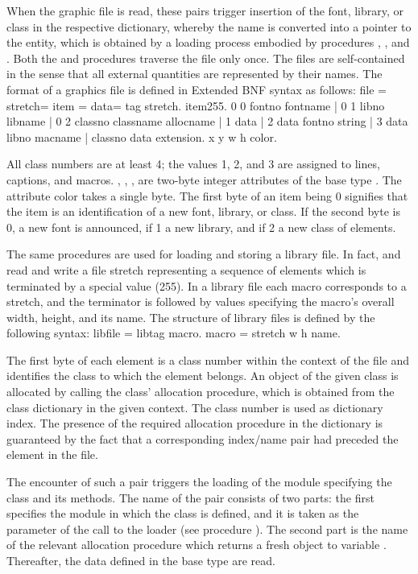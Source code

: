 When the graphic file is read, these pairs trigger insertion of the font, library, or class in the respective dictionary, whereby the name is converted into a pointer to the entity, which is obtained by a loading process embodied by procedures , , and . Both the  and  procedures traverse the file only once. The files are self-contained in the sense that all external quantities are represented by their names. The format of a graphics file is defined in Extended BNF syntax as follows:
\begintt
file = stretch= item =
data=
tag stretch.
{item}255.
0 0 fontno fontname | 0 1 libno libname | 0 2 classno classname allocname |
1 data | 2 data fontno string | 3 data libno macname | classno data extension. x y w h color.
\endtt

All class numbers are at least 4; the values 1, 2, and 3 are assigned to lines, captions, and macros. , , ,  are two-byte integer attributes of the base type . The attribute color takes a single byte. The first byte of an item being 0 signifies that the item is an identification of a new font, library, or class. If the second byte is 0, a new font is announced, if 1 a new library, and if 2 a new class of elements.

The same procedures are used for loading and storing a library file. In fact,  and  read and write a file stretch representing a sequence of elements which is terminated by a special value (255). In a library file each macro corresponds to a stretch, and the terminator is followed by values specifying the macro's overall width, height, and its name. The structure of library files is defined by the following syntax:
\begintt
libfile = libtag {macro}. macro = stretch w h name.
\endtt

The first byte of each element is a class number within the context of the file and identifies the class to which the element belongs. An object of the given class is allocated by calling the class' allocation procedure, which is obtained from the class dictionary in the given context. The class number is used as dictionary index. The presence of the required allocation procedure in the dictionary is guaranteed by the fact that a corresponding index/name pair had preceded the element in the file.

The encounter of such a pair triggers the loading of the module specifying the class and its methods. The name of the pair consists of two parts: the first specifies the module in which the class is defined, and it is taken as the parameter of the call to the loader (see procedure ). The second part is the name of the relevant allocation procedure which returns a fresh object to variable . Thereafter, the data defined in the base type  are read.

